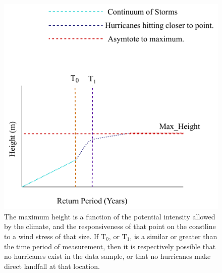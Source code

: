 \begin{figure}[htb!]
    \centering
    \includegraphics[width=1\linewidth]{images/Return_Hypothesis.pdf}
    \vspace{-15pt}
   \caption{The maximum height is a function of the potential intensity
   allowed by the climate, and the responsiveness of that point on the coastline to a
   wind stress of that size. If T$_0$, or T$_1$, is a similar or greater than the time period of
   measurement, then it is respectively possible that no hurricanes exist in the data sample,
   or that no hurricanes make direct landfall at that location.}
     \label{fig:return_hyp_new}

\end{figure}

